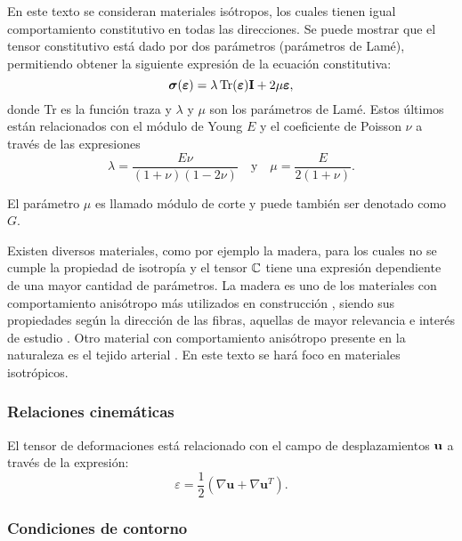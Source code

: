 En este texto se consideran materiales isótropos, los cuales tienen igual comportamiento constitutivo en todas las direcciones. %
%
Se puede mostrar que el tensor constitutivo está dado por dos parámetros (parámetros de Lamé), permitiendo obtener la siguiente expresión de la ecuación constitutiva:
%
\begin{equation}\label{eqn:eccons}
\boldsymbol{\sigma} (\boldsymbol{\varepsilon}) = \lambda \operatorname{\text{Tr}} (\boldsymbol{\varepsilon}) {\bf I} + 2 \mu \boldsymbol{\varepsilon},
\end{equation}
%
donde Tr es la función traza y $\lambda$ y $\mu$ son los parámetros de Lamé. %
%
Estos últimos están relacionados con el módulo de Young $E$ y el coeficiente de Poisson $\nu$ a través de las expresiones
%
\begin{equation}
 \lambda = \frac{E \nu}{(1+\nu)(1-2 \nu)} \quad \text{y} \quad
 \mu = \frac{E}{2(1+\nu)}.
\end{equation}

El parámetro $\mu$ es llamado módulo de corte y puede también ser denotado como $G$.

Existen diversos materiales, como por ejemplo la madera, para los cuales no se cumple la propiedad de isotropía y el tensor ${\mathbb C}$ tiene una expresión dependiente de una mayor cantidad de parámetros. %
%
La madera es uno de los materiales con comportamiento anisótropo más utilizados en construcción \citep{Pereira2014a}, siendo sus propiedades según la dirección de las fibras, aquellas de mayor relevancia e interés de estudio \citep{PerezZerpa2017}. %
%
Otro material con comportamiento anisótropo presente en la naturaleza es el tejido arterial \citep{Holzapfel2000}. %
%
En este texto se hará foco en materiales isotrópicos. %


\subsubsection*{Relaciones cinemáticas}

El tensor de deformaciones está relacionado con el campo de desplazamientos ${\bf u}$ a través de la expresión:
%
\begin{equation}\label{eqn:relcin}
\varepsilon = \frac{1}{2} ( \nabla \textbf{u} + \nabla \textbf{u}^T ).
\end{equation}

\subsubsection*{Condiciones de contorno}


